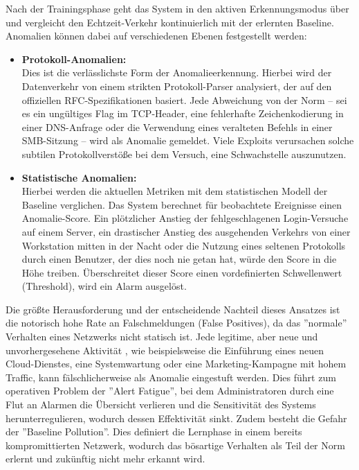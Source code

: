 Nach der Trainingsphase geht das System in den aktiven Erkennungsmodus über und vergleicht den Echtzeit-Verkehr kontinuierlich mit der erlernten Baseline. Anomalien können dabei auf verschiedenen Ebenen festgestellt werden:\\
\begin{itemize}
	\item \textbf{Protokoll-Anomalien:} \\Dies ist die verlässlichste Form der Anomalieerkennung. Hierbei wird der Datenverkehr von einem strikten Protokoll-Parser analysiert, der auf den offiziellen RFC-Spezifikationen basiert. Jede Abweichung von der Norm – sei es ein ungültiges Flag im TCP-Header, eine fehlerhafte Zeichenkodierung in einer DNS-Anfrage oder die Verwendung eines veralteten Befehls in einer SMB-Sitzung – wird als Anomalie gemeldet. Viele Exploits verursachen solche subtilen Protokollverstöße bei dem Versuch, eine Schwachstelle auszunutzen.\\

\item\textbf{ Statistische Anomalien:} \\Hierbei werden die aktuellen Metriken mit dem statistischen Modell der Baseline verglichen. Das System berechnet für beobachtete Ereignisse einen Anomalie-Score. Ein plötzlicher Anstieg der fehlgeschlagenen Login-Versuche auf einem Server, ein drastischer Anstieg des ausgehenden Verkehrs von einer Workstation mitten in der Nacht oder die Nutzung eines seltenen Protokolls durch einen Benutzer, der dies noch nie getan hat, würde den Score in die Höhe treiben. Überschreitet dieser Score einen vordefinierten Schwellenwert (Threshold), wird ein Alarm ausgelöst.
\end{itemize}
Die größte Herausforderung und der entscheidende Nachteil dieses Ansatzes ist die notorisch hohe Rate an Falschmeldungen (False Positives), da das ''normale'' Verhalten eines Netzwerks nicht statisch ist. Jede legitime, aber neue und unvorhergesehene Aktivität , wie beispielsweise die Einführung eines neuen Cloud-Dienstes, eine Systemwartung oder eine Marketing-Kampagne mit hohem Traffic, kann fälschlicherweise als Anomalie eingestuft werden. Dies führt zum operativen Problem der ''Alert Fatigue'', bei dem Administratoren durch eine Flut an Alarmen die Übersicht verlieren und die Sensitivität des Systems herunterregulieren, wodurch dessen Effektivität sinkt. Zudem besteht die Gefahr der ''Baseline Pollution''. Dies definiert die Lernphase in einem bereits kompromittierten Netzwerk, wodurch das bösartige Verhalten als Teil der Norm erlernt und zukünftig nicht mehr erkannt wird.\\

